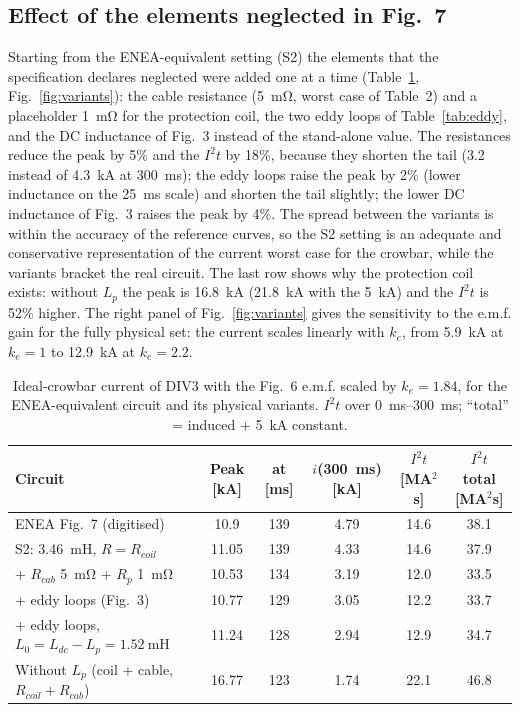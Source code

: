 \documentclass[11pt,a4paper]{article}
\begin{document}
\subsection{Effect of the elements neglected in Fig.~7}
\label{sec:variants}
Starting from the ENEA-equivalent setting (S2) the elements that the specification declares neglected were added one at a time (Table~\ref{tab:variants}, Fig.~\ref{fig:variants}): the cable resistance (\SI{5}{\milli\ohm}, worst case of Table~2) and a placeholder \SI{1}{\milli\ohm} for the protection coil, the two eddy loops of Table~\ref{tab:eddy}, and the DC inductance of Fig.~3 instead of the stand-alone value. The resistances reduce the peak by 5\% and the $I^2t$ by 18\%, because they shorten the tail (\SI{3.2}{} instead of \SI{4.3}{\kilo\ampere} at \SI{300}{\milli\second}); the eddy loops raise the peak by 2\% (lower inductance on the \SI{25}{\milli\second} scale) and shorten the tail slightly; the lower DC inductance of Fig.~3 raises the peak by 4\%. The spread between the variants is within the accuracy of the reference curves, so the S2 setting is an adequate and conservative representation of the current worst case for the crowbar, while the variants bracket the real circuit. The last row shows why the protection coil exists: without $L_p$ the peak is \SI{16.8}{\kilo\ampere} (\SI{21.8}{\kilo\ampere} with the \SI{5}{\kilo\ampere}) and the $I^2t$ is 52\% higher. The right panel of Fig.~\ref{fig:variants} gives the sensitivity to the e.m.f. gain for the fully physical set: the current scales linearly with $k_e$, from \SI{5.9}{\kilo\ampere} at $k_e = 1$ to \SI{12.9}{\kilo\ampere} at $k_e = 2.2$.

\begin{table}[htbp]
\centering\small
\caption{Ideal-crowbar current of DIV3 with the Fig.~6 e.m.f. scaled by $k_e = 1.84$, for the ENEA-equivalent circuit and its physical variants. $I^2t$ over \SIrange{0}{300}{\milli\second}; ``total'' = induced + \SI{5}{\kilo\ampere} constant.}
\label{tab:variants}
\footnotesize
\begin{tabular}{@{}lccccc@{}}
\toprule
Circuit & Peak [kA] & at [ms] & $i$(\SI{300}{\milli\second}) [kA] & $I^2t$ [MA$^2$s] & $I^2t$ total [MA$^2$s]\\
\midrule
ENEA Fig.~7 (digitised) & 10.9 & 139 & 4.79 & 14.6 & 38.1\\
S2: \SI{3.46}{\milli\henry}, $R = R_{coil}$ & 11.05 & 139 & 4.33 & 14.6 & 37.9\\
+ $R_{cab}$ \SI{5}{\milli\ohm} + $R_p$ \SI{1}{\milli\ohm} & 10.53 & 134 & 3.19 & 12.0 & 33.5\\
+ eddy loops (Fig.~3) & 10.77 & 129 & 3.05 & 12.2 & 33.7\\
+ eddy loops, $L_0 = L_{dc} - L_p = \SI{1.52}{\milli\henry}$ & 11.24 & 128 & 2.94 & 12.9 & 34.7\\
Without $L_p$ (coil + cable, $R_{coil}+R_{cab}$) & 16.77 & 123 & 1.74 & 22.1 & 46.8\\
\bottomrule
\end{tabular}
\end{table}
\end{document}
